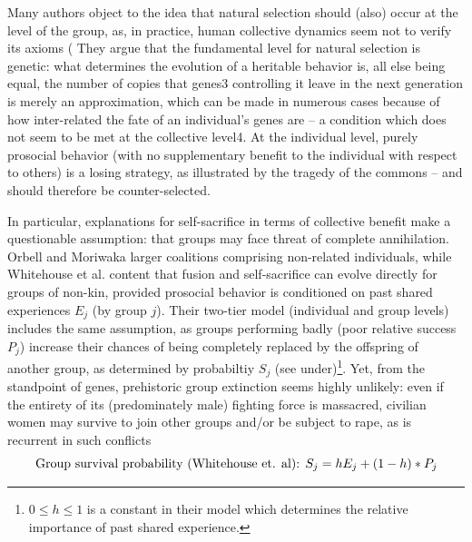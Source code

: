 \documentclass[a4paper,12pt]{report}
\begin{document}
Many authors object to the idea that natural selection should (also) occur at the
level of the group, as, in practice, human collective dynamics seem not to verify
its axioms (%
They argue that the fundamental level
for natural selection is genetic: what determines the evolution of a heritable behavior
is, all else being equal, the number of copies that genes3 controlling it leave in the
next generation %
is merely an approximation, which can be made in numerous cases because of how inter-related
the fate of an individual’s genes are – a condition which does not seem to be met at
the collective level4. At the individual level, purely prosocial behavior
(with no supplementary benefit to the individual with respect to others)
is a losing strategy, as illustrated by the tragedy of the commons %
– and should therefore be counter-selected.

In particular, explanations for self-sacrifice in terms of collective benefit make a
questionable assumption: that groups may face threat of complete annihilation.
Orbell and Moriwaka %
larger coalitions comprising non-related individuals, while Whitehouse et al. %
content that fusion and self-sacrifice can evolve directly for groups of non-kin,
provided prosocial behavior is conditioned on past shared experiences $E_j$
(by group $j$). Their two-tier
model (individual and group levels) includes the same assumption, as groups performing
badly (poor relative success $P_j$) increase their chances of being completely 
replaced by the offspring of another group, as determined by probabiltiy $S_j$ 
(see under)\footnote{
    $0 \leq h \leq 1$ is a constant in their model which determines the relative importance of
    past shared experience.}.
Yet, from the standpoint of genes, prehistoric group extinction seems highly
unlikely: even if the entirety of its (predominately male) fighting force is massacred,
civilian women may survive to join other groups and/or be subject to rape, as is
recurrent in such conflicts %
\[\textnormal{Group survival probability (Whitehouse et. al):
}
    S_j = hE_j + (1-h)*P_j \]
\end{document}
